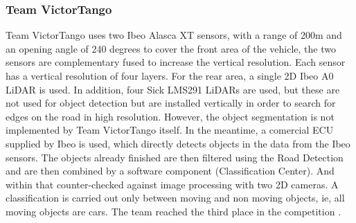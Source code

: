\documentclass[11pt,oneside,openright]{mpreport}
\begin{document}
\subsubsection{Team VictorTango}

Team VictorTango \cite{Atreya2007} uses two Ibeo Alasca XT sensors, with a range of 200m and an opening angle of 240 degrees to cover the front area of the vehicle, 
the two sensors are complementary fused to increase the vertical resolution. Each sensor has a vertical resolution of four layers. For the rear area, a single 2D Ibeo A0 LiDAR is used. 
In addition, four Sick LMS291 LiDARs are used, but these are not used for object detection but are installed vertically in order to search for edges on the road in high resolution.
However, the object segmentation is not implemented by Team VictorTango itself. In the meantime, a comercial ECU supplied by Ibeo is used, which directly detects objects in the data from the Ibeo sensors.
The objects already finished are then filtered using the Road Detection and are then combined by a software component (Classification Center). And within that counter-checked against image processing
with two 2D cameras. A classification is carried out only between moving and non moving objects, ie, all moving objects are cars. The team reached the third place in the competition \cite{Release2007}.
\end{document}
